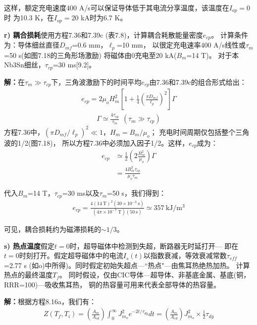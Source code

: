 这样，额定充电速度400 A/s可以保证导体低于其电流分享温度，该温度在$I_{op}=0$时
为10.3 K，在$I_{op}=20$ kA时为6.7 K。

\textbf{r) 耦合损耗}\qquad 使用方程7.36和7.39c (表7.8)，计算耦合耗散能量密度$e_{cp}$。
计算条件为：导体细丝直径$D_{mf}$=0.6 mm，$\ell_p$=10 mm，
以很定充电速率400 A/s线性或$\tau_m$=50 s(如图7.18的三角形场激励)
将磁体由0充电至20 kA($B_m$=14 T)。
对于本Nb3Sn细丝，$\tau_{cp}$=30 ms[9.2]。

\textbf{解：}在$\tau_m\gg \tau_{cp}$下，三角波激励下的时间平均$e_{cp}$由7.36和7.39c的组合形式给出：
\begin{align*}%
e_{cp}=2\mu_oH_{m}^2[1+\frac{1}{4}(\frac{\pi D_{mf}}{\ell_p})^2]\Gamma \tag{7.36}
\end{align*}
\begin{align*}%
\Gamma\simeq\frac{4\tau_{cp}}{\tau_m}\   \  (\tau_m\gg \tau_{cp}) \tag{7.39c}
\end{align*}
方程7.36中，$(\pi D_{mf}/\ell_p)^2\ll 1$，$H_m=B_m/\mu_o$；
充电时间周期仅包括整个三角波的1/2(图7.18)，
所以方程7.36中必须加入因子1/2。这样，$e_{cp}$成为：
\begin{align*}%
e_{cp}&\simeq\frac{1}{2}(2\frac{B_m^2}{\mu_o})\Gamma\\
&=\frac{4B_m^2\tau_{cp}}{\mu_o\tau_m} \tag{r.1}
\end{align*}

代入$B_m$=14 T，$\tau_{cp}$=30 ms以及$\tau_m$=50 s，我们得到：
\begin{align*}%
e_{cp}=\frac{4(14\ \mathrm{T})^2(30\times 10^{-3}\ \mathrm{s})}{(4\pi\times 10^{-7}\ \mathrm{T})(50\ \mathrm{s})}\simeq 357\ \mathrm{kJ/m^3}
\end{align*}

可见，耦合损耗约为磁滞损耗的$\sim 1/3$。

\textbf{s) 热点温度}\qquad 假定$t=0$时，超导磁体中检测到失超，断路器无时延打开---
即在$t=0$时刻打开。假定超导磁体中的电流$I_s(t)$以指数衰减，等效衰减常数$\tau_{eff}$=2.77 s
(如o)中所得)。同时假定初始失超点---``热点"---由焦耳热绝热加热。
计算热点的最终温度$T_f$。
同时假设，仅由CIC导体---超导体、非基底金属、基底(铜，RRR=100)---吸收焦耳热，
铜的热容量可用来代表全部导体的热容量。

\textbf{解：}根据方程8.16a，我们有：
\begin{align*}%
Z(T_f,T_i)=\left(\frac{A_m}{A_{cd}}\right)\int_{0}^{\infty}J_{m_o}^2e^{-2t/\tau_{dg}}dt=\left(\frac{A_m}{A_{cd}}\right)J_{m_o}^2\times\frac{1}{2}\tau_{dg} \tag{8.16a}
\end{align*}

